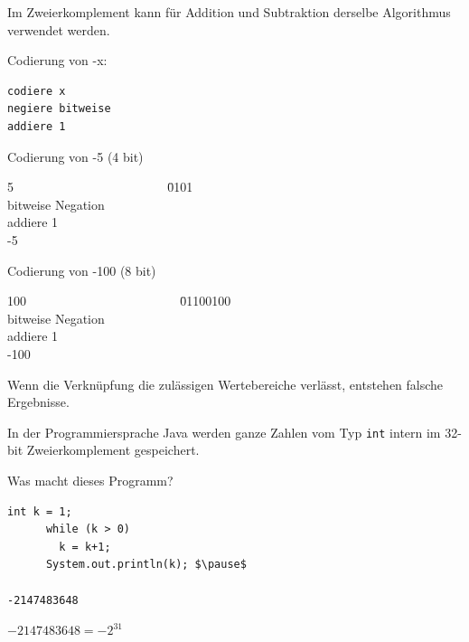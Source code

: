 \documentclass[10pt]{beamer}
\begin{document}
\begin{frame}[fragile]
Im Zweierkomplement kann für Addition und Subtraktion derselbe Algorithmus verwendet werden.



Codierung von -x:
\begin{lstlisting}[mathescape=true]
codiere x
negiere bitweise
addiere 1
\end{lstlisting} \pause

\begin{minipage}[c]{5.5cm}
Codierung von -5 (4 bit) \pause
\begin{tabbing}
5  ~~~~~~~~~~~~~~~~~~~~~~~ \= 0101  \\
bitweise Negation  \\
addiere 1  \\
-5  
 \end{tabbing} 
\end{minipage} \pause
\begin{minipage}[c]{5.5cm}
 Codierung von -100 (8 bit) \pause
\begin{tabbing}
100  ~~~~~~~~~~~~~~~~~~~~~~~ \= 01100100 \\
bitweise Negation   \\
addiere 1  \\
-100 
 \end{tabbing}
 \end{minipage}  
 
Wenn die Verknüpfung die zulässigen Wertebereiche verlässt, entstehen falsche Ergebnisse.
\end{frame}

\begin{frame}[fragile]
In der Programmiersprache Java werden ganze Zahlen vom Typ \texttt{int} intern im 32-bit Zweierkomplement gespeichert.

Was macht dieses Programm?
\begin{lstlisting}[mathescape=true]
	  int k = 1;
	  while (k > 0) 
	    k = k+1;
	  System.out.println(k); $\pause$
	  
-2147483648  	  
\end{lstlisting} \pause

$-2147483648  = -2^{31}$
\end{frame}
\end{document}
